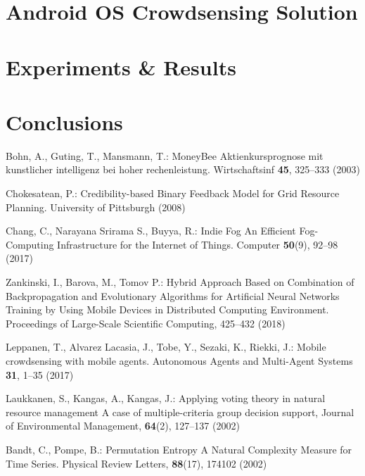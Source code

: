 \documentclass[runningheads]{llncs}
\begin{document}
\section{Android OS Crowdsensing Solution}
%
\section{Experiments \& Results}
%
\section{Conclusions}
%
%
%
% 
% 
%
\begin{thebibliography}{8}

 Bohn, A., Guting, T., Mansmann, T.: MoneyBee Aktienkursprognose mit kunstlicher intelligenz bei hoher rechenleistung. Wirtschaftsinf \textbf{45}, 325--333 (2003)

 Chokesatean, P.: Credibility-based Binary Feedback Model for Grid Resource Planning. University of Pittsburgh (2008)

 Chang, C., Narayana Srirama S., Buyya, R.: Indie Fog An Efficient Fog-Computing Infrastructure for the Internet of Things. Computer \textbf{50}(9), 92--98 (2017)

 Zankinski, I., Barova, M., Tomov P.: Hybrid Approach Based on Combination of Backpropagation and Evolutionary Algorithms for Artificial Neural Networks Training by Using Mobile Devices in Distributed Computing Environment. Proceedings of Large-Scale Scientific Computing, 425--432 (2018)

 Leppanen, T., Alvarez Lacasia, J., Tobe, Y., Sezaki, K., Riekki, J.: Mobile crowdsensing with mobile agents. Autonomous Agents and Multi-Agent Systems \textbf{31}, 1--35 (2017)

 Laukkanen, S., Kangas, A., Kangas, J.: Applying voting theory in natural resource management A case of multiple-criteria group decision support, Journal of Environmental Management, \textbf{64}(2), 127--137 (2002)

 Bandt, C., Pompe, B.: Permutation Entropy A Natural Complexity Measure for Time Series. Physical Review Letters, \textbf{88}(17), 174102 (2002)


\end{thebibliography}
\end{document}
